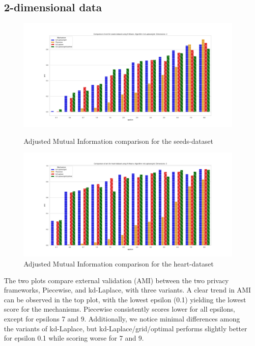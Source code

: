 \subsection{2-dimensional data}
\begin{figure}[H]
    \centering
    \begin{minipage}[c]{0.8\textwidth}
        \includegraphics[width=1\textwidth]{Results/RQ1/seeds-dataset/ami_seeds-dataset_comparison.png}
        \caption{Adjusted Mutual Information comparison for the seeds-dataset}
        \label{fig:ami_seeds-dataset_comparison_2d}
    \end{minipage}
    \begin{minipage}[c]{0.8\textwidth}
        \includegraphics[width=1\textwidth]{Results/RQ1/heart-dataset/ami_heart-dataset_comparison.png}
        \caption{Adjusted Mutual Information comparison for the heart-dataset}
        \label{fig:ami_heart-dataset_comparison_2d}
    \end{minipage}

\end{figure}
The two plots compare external validation (AMI) between the two privacy frameworks, Piecewise, and kd-Laplace, with three variants.
A clear trend in AMI can be observed in the top plot, with the lowest epsilon (0.1) yielding the lowest score for the mechanisms.
Piecewise consistently scores lower for all epsilons, except for epsilons 7 and 9.
Additionally, we notice minimal differences among the variants of kd-Laplace, but kd-Laplace/grid/optimal performs slightly better for epsilon 0.1 while scoring worse for 7 and 9.
\newpage
